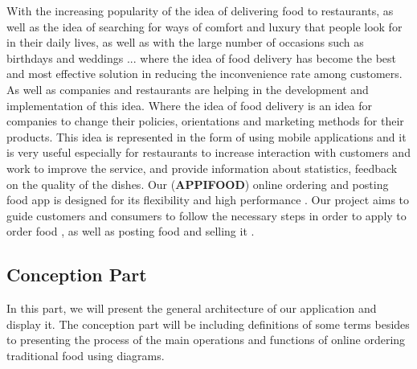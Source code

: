 \PARstart With the increasing popularity of the idea of delivering food to restaurants, as well as the idea of searching for ways of comfort and luxury that people look for in their daily lives, as well as with the large number of occasions such as birthdays and weddings ... where the idea of food delivery has become the best and most effective solution in reducing the inconvenience rate among customers. As well as companies and restaurants are helping in the development and implementation of this idea. Where the idea of food delivery is an idea for companies to change their policies, orientations and marketing methods for their products.
 This idea is represented in the form of using mobile applications and it is very useful especially for restaurants to increase interaction with customers and work to improve the service, and provide information about statistics, feedback on the quality of the dishes. Our (\textbf{APPIFOOD}) online  ordering and posting food app is designed for its flexibility and high performance .
Our project aims to guide customers and consumers to follow the necessary steps in order to apply to order food  , as well as posting food and selling it .


\newpage
\subsection{Conception Part}
In this part, we will present the general architecture of our application and display it. The conception part will be including definitions of some terms besides to presenting the process of the main operations and functions of online ordering traditional food  using  diagrams.

